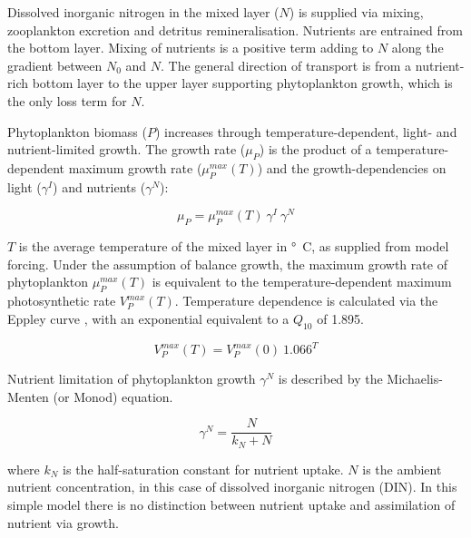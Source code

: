\documentclass[journal abbreviation, manuscript]{copernicus}
\begin{document}
Dissolved inorganic nitrogen in the mixed layer ($N$) is supplied via mixing, zooplankton excretion and detritus remineralisation.
Nutrients are entrained from the bottom layer. Mixing of nutrients is a positive term adding to $N$ along the gradient between $N_0$ and $N$. The general direction of transport is from a nutrient-rich bottom layer to the upper layer supporting phytoplankton growth, which is the only loss term for $N$.

Phytoplankton biomass ($P$) increases through temperature-dependent, light- and nutrient-limited growth. The growth rate ($\mu_{P}$) is the product of a temperature-dependent maximum growth rate ($\mu_P^{max}(T)$) and the growth-dependencies on light ($\gamma^{I}$) and nutrients ($\gamma^{N}$): 

\begin{equation}
    \mu_{P} = \mu_P^{max}(T) \ \gamma^{I} \ \gamma^{N}
\end{equation}

$T$ is the average temperature of the mixed layer in \unit{\degree C}, as supplied from model forcing. Under the assumption of balance growth, the maximum growth rate of phytoplankton $\mu_P^{max}(T)$ is equivalent to the temperature-dependent maximum photosynthetic rate $V_P^{max}(T)$. Temperature dependence is calculated via the Eppley curve \citep{Eppley1972TemperatureSea}, with an exponential equivalent to a $Q_{10}$ of 1.895.

\begin{equation}
    V_P^{max}(T) = V_P^{max}(0) \ 1.066^T
\end{equation}

Nutrient limitation of phytoplankton growth $\gamma^N$ is described by the Michaelis-Menten (or Monod) equation.

\begin{equation}
    \gamma^N = \frac{N}{k_N + N}
\end{equation}

where $k_N$ is the half-saturation constant for nutrient uptake. $N$ is the ambient nutrient concentration, in this case of dissolved inorganic nitrogen (DIN). In this simple model there is no distinction between nutrient uptake and assimilation of nutrient via growth.
\end{document}
